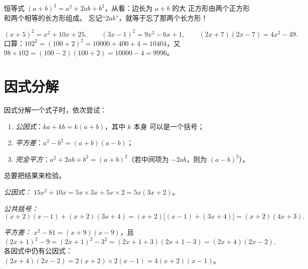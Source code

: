 \begin{omfigure}

{\small 恒等式 $(a+b)^2 = a^2 + 2ab + b^2$，从看：边长为 $a+b$ 的大
正方形由两个正方形和两个相等的长方形组成。
忘记“$2ab$”，就等于忘了那两个长方形！}
\end{omfigure}

\begin{example}\label{ex:g9:algebra:identities}
\[
(x + 5)^2 = x^2 + 10x + 25, \qquad
(3x - 1)^2 = 9x^2 - 6x + 1, \qquad
(2x + 7)(2x - 7) = 4x^2 - 49 .
\]
口算：$102^2 = (100 + 2)^2 = 10000 + 400 + 4 = 10404$，又
$98 \times 102 = (100-2)(100+2) = 10000 - 4 = 9996$。
\end{example}

\section{因式分解}

\begin{method}[因式分解]\label{met:g9:algebra:factor}
因式分解一个式子时，依次尝试：
\begin{enumerate}
  \item \emph{公因式}：$ka + kb = k(a + b)$，其中 $k$ 本身
        可以是一个括号；
  \item \emph{平方差}：$a^2 - b^2 = (a+b)(a-b)$；
  \item \emph{完全平方}：$a^2 + 2ab + b^2 = (a+b)^2$（若中间项为
        $-2ab$，则为 $(a-b)^2$）。
\end{enumerate}
总要把结果来检验。
\end{method}

\begin{example}\label{ex:g9:algebra:factor}
\emph{公因式：}
$15x^2 + 10x = 5x \times 3x + 5x \times 2 = 5x(3x + 2)$。

\emph{公共括号：}
\[
(x+2)(x-1) + (x+2)(3x+4) = (x+2)\bigl[(x-1) + (3x+4)\bigr]
= (x+2)(4x+3).
\]

\emph{平方差：}
$x^2 - 81 = (x+9)(x-9)$，且
\[
(2x+1)^2 - 9 = (2x+1)^2 - 3^2 = (2x+1+3)(2x+1-3) = (2x+4)(2x-2).
\]
各因式中仍有公因式：$(2x+4)(2x-2) = 2(x+2) \times
2(x-1) = 4(x+2)(x-1)$。
\end{example}

